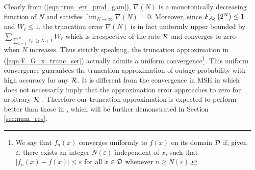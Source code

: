 \documentclass[12pt,onecolumn,draftcls]{IEEEtran}
\newcommand{\bs}{\boldsymbol}
\begin{document}
Clearly from (\ref{eqn:trun_err_prod_gam}), $\nabla(N)$ is a monotonically decreasing function of $N$ and satisfies $\lim_{N \rightarrow \infty} \nabla(N) =0$. Moreover, since ${{F_{{ {\cal A}_{\bs{\ell}}}}}\left( 2^{\cal R} \right)} \le 1$ and ${{W_{\bs{\ell}}}} \le 1$, the truncation error $\nabla(N)$ is in fact uniformly upper bounded by ${\sum\nolimits_{{\sum\nolimits_{k=1}^K  \ell_k \ge N+1}}  {{W_{\bs{\ell}}}} }$ which is irrespective of the rate $\cal R$ and converges to zero when $N$ increases. Thus strictly speaking, the truncation approximation in (\ref{eqn:F_G_x_trunc_ser}) actually admits a uniform convergence\cite[p147]{rudin1964principles}\footnote{We say that $f_n(x)$ converges uniformly to $f(x)$ on its domain $\cal D$ if, given $\varepsilon $, there exists an integer $N(\varepsilon )$ independent of $x$, such that $|f_n(x)-f(x)|\le \varepsilon $ for all $x \in \cal D$ whenever $n \ge N(\varepsilon )$\cite[p147]{rudin1964principles}.}. This uniform convergence guarantees the truncation approximation of outage probability with high accuracy for any $\cal R$. It is different from the convergence in MSE in \cite{shi2015analysis,shi2016inverse} which does not necessarily imply that the approximation error approaches to zero for arbitrary $\cal R$ \cite[p86]{adams2013continuous}. Therefore our truncation approximation is expected to perform better than those in \cite{shi2015analysis,shi2016inverse}, which will be further demonstrated in Section \ref{sec:num_res}.
\end{document}

